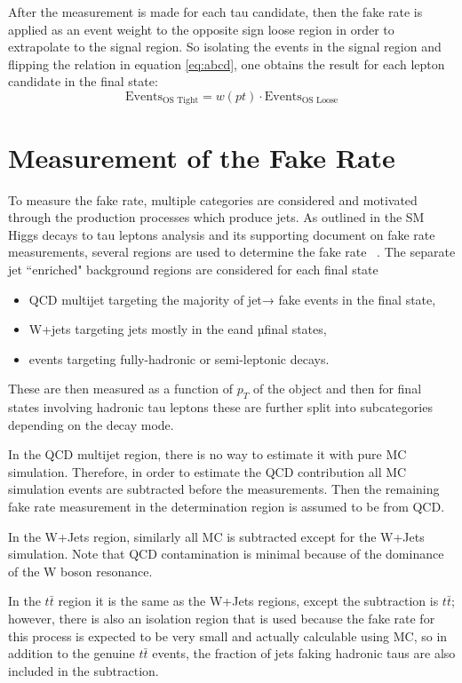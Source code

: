 After the measurement is made for each tau candidate, then the fake rate is applied as an event weight to the opposite sign loose region in order to extrapolate to the signal region. So isolating the events in the signal region and flipping the relation in equation \ref{eq:abcd}, one obtains the result for each lepton candidate in the final state: 
\begin{equation}
\text{Events}_\text{OS Tight} = w(pt)\cdot \text{Events}_\text{OS Loose}  
\end{equation}

\section{Measurement of the Fake Rate}
To measure the fake rate, multiple categories are considered and motivated through the production processes which produce jets. As outlined in the SM Higgs decays to tau leptons analysis and its supporting document on fake rate measurements, several regions are used to determine the fake rate ~\cite{SMHTTarXiv}. The separate jet ``enriched" background regions are considered for each final state
\begin{itemize}
	\item QCD multijet targeting the majority of jet→ \tauh fake events in the \tauh \tauh final state,
	\item W+jets targeting jets mostly in the e\tauh and µ\tauh final states,
	\item \ttbar events targeting fully-hadronic or semi-leptonic decays.
\end{itemize} 



These are then measured as a function of $p_T$ of the object and then for final states involving hadronic tau leptons these are further split into subcategories depending on the decay mode.  

In the QCD multijet region, there is no way to estimate it with pure MC simulation. Therefore, in order to estimate the QCD contribution all MC simulation events are subtracted before the measurements. Then the remaining fake rate measurement in the determination region is assumed to be from QCD.

In the W+Jets region, similarly all MC is subtracted except for the W+Jets simulation. Note that QCD contamination is minimal because of the dominance of the W boson resonance. 

In the $t\bar{t}$ region it is the same as the W+Jets regions, except the subtraction is $t\bar{t}$; however, there is also an isolation region that is used because the fake rate for this process is expected to be very small and actually calculable using MC, so in addition to the genuine $t\bar{t}$ events, the fraction of jets faking hadronic taus are also included in the subtraction. 



